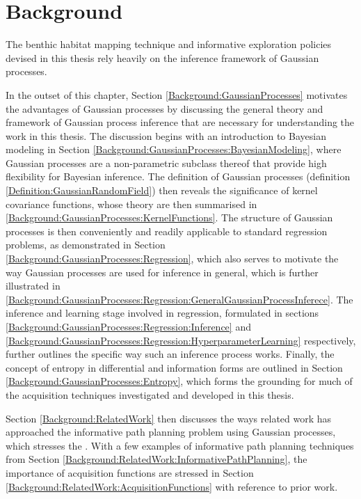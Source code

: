\chapter{Background}
\label{Background}

	The benthic habitat mapping technique and informative exploration policies devised in this thesis rely heavily on the inference framework of Gaussian processes. 
	
	In the outset of this chapter, Section \ref{Background:GaussianProcesses} motivates the advantages of Gaussian processes by discussing the general theory and framework of Gaussian process inference that are necessary for understanding the work in this thesis. The discussion begins with an introduction to Bayesian modeling in Section \ref{Background:GaussianProcesses:BayesianModeling}, where Gaussian processes are a non-parametric subclass thereof that provide high flexibility for Bayesian inference. The definition of Gaussian processes (definition \ref{Definition:GaussianRandomField}) then reveals the significance of kernel covariance functions, whose theory are then summarised in \ref{Background:GaussianProcesses:KernelFunctions}. The structure of Gaussian processes is then conveniently and readily applicable to standard regression problems, as demonstrated in Section \ref{Background:GaussianProcesses:Regression}, which also serves to motivate the way Gaussian processes are used for inference in general, which is further illustrated in \ref{Background:GaussianProcesses:Regression:GeneralGaussianProcessInferece}. The inference and learning stage involved in regression, formulated in sections \ref{Background:GaussianProcesses:Regression:Inference} and \ref{Background:GaussianProcesses:Regression:HyperparameterLearning} respectively, further outlines the specific way such an inference process works. Finally, the concept of entropy in differential and information forms are outlined in Section \ref{Background:GaussianProcesses:Entropy}, which forms the grounding for much of the acquisition techniques investigated and developed in this thesis.
	
	
	Section \ref{Background:RelatedWork} then discusses the ways related work has approached the informative path planning problem using Gaussian processes, which stresses the . With a few examples of informative path planning techniques from Section \ref{Background:RelatedWork:InformativePathPlanning}, the importance of acquisition functions are stressed in Section \ref{Background:RelatedWork:AcquisitionFunctions} with reference to prior work.
	
